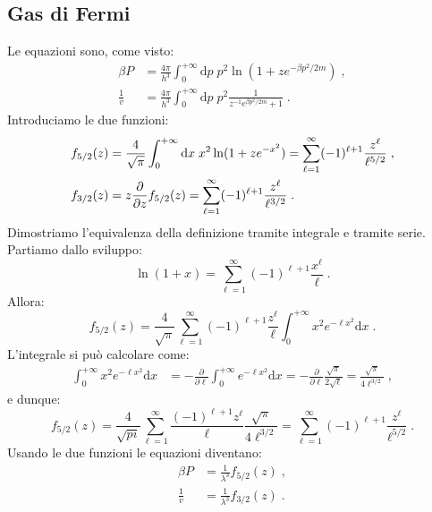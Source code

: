 \documentclass[10pt,a4paper]{report}
\theoremstyle{definition}
\numberwithin{equation}{section}
\newcommand{\diff}[1][]{\mathrm{d}#1}
\begin{document}
\subsection{Gas di Fermi}
Le equazioni sono, come visto:
\begin{align*}
\beta P&=\frac{4\pi}{h^3}\int_0^{+\infty}\diff{p}\;p^2\ln(1+ze^{-\beta p^2/2m})\;, \\
\frac{1}{v}&=\frac{4\pi}{h^3}\int_0^{+\infty}\diff{p}\;p^2\frac{1}{z^{-1}e^{\beta p^2/2m}+1}\;.
\end{align*}
Introduciamo le due funzioni:
\begin{align}
f_{5/2}(z)&=\frac{4}{\sqrt{\pi}}\int_0^{+\infty}\diff{x}\;x^2\ln(1+ze^{-x^2})=\sum_{\ell=1}^{\infty}(-1)^{\ell+1}\frac{z^{\ell}}{\ell^{5/2}}\;, \notag \\
f_{3/2}(z)&=z\frac{\partial}{\partial z}f_{5/2}(z)=\sum_{\ell=1}^{\infty}(-1)^{\ell+1}\frac{z^{\ell}}{\ell^{3/2}}\;.
\end{align}
Dimostriamo l'equivalenza della definizione tramite integrale e tramite serie. Partiamo dallo sviluppo:
$$
\ln(1+x)=\sum_{\ell=1}^{\infty}(-1)^{\ell+1}\frac{x^{\ell}}{\ell}\;.
$$
Allora:
$$
f_{5/2}(z)=\frac{4}{\sqrt{\pi}}\sum_{\ell=1}^{\infty}(-1)^{\ell+1}\frac{z^{\ell}}{\ell}\int_0^{+\infty}x^2 e^{-\ell x^2}\diff{x}\;.
$$
L'integrale si può calcolare come:
\begin{align*}
\int_0^{+\infty} x^2 e^{-\ell x^2}\diff{x} &= -\frac{\partial}{\partial \ell}\int_0^{+\infty}e^{-\ell x^2}\diff{x} = -\frac{\partial}{\partial\ell}\frac{\sqrt{\pi}}{2\sqrt{\ell}}=\frac{\sqrt{\pi}}{4\ell^{3/2}}\;,
\end{align*}
e dunque:
$$
f_{5/2}(z)=\frac{4}{\sqrt{pi}}\sum_{\ell=1}^{\infty}\frac{(-1)^{\ell+1}z^{\ell}}{\ell}\frac{\sqrt{\pi}}{4\ell^{3/2}}=\sum_{\ell=1}^{\infty}(-1)^{\ell+1}\frac{z^{\ell}}{\ell^{5/2}}\;.
$$
Usando le due funzioni le equazioni diventano:
\begin{align}
\beta P&=\frac{1}{\lambda^3}f_{5/2}(z)\;, \\
\frac{1}{v}&=\frac{1}{\lambda^3}f_{3/2}(z)\;.
\end{align}
\end{document}
